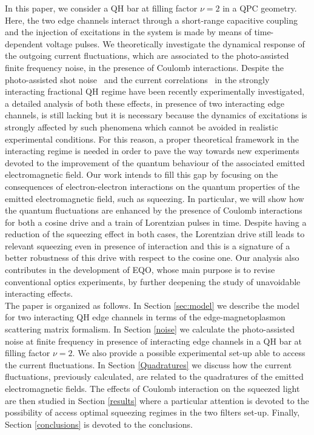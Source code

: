 \documentclass[12pt]{iopart}
\begin{document}
In this paper, we consider a QH bar at filling factor $\nu=2$ in a QPC geometry. Here, the two edge channels interact through a short-range capacitive coupling and the injection of excitations in the system is made by means of time-dependent voltage pulses. We theoretically investigate the dynamical response of the outgoing current fluctuations, which are associated to the photo-assisted finite frequency noise, in the presence of Coulomb interactions. Despite the photo-assisted shot noise~\cite{Kapfer19} and the current correlations~\cite{Bartolomei20} in the strongly interacting fractional QH regime have been recently experimentally investigated, a detailed analysis of both these effects, in presence of two interacting edge channels, is still lacking but it is necessary because the dynamics of excitations is strongly affected by such phenomena which cannot be avoided in realistic experimental conditions. For this reason, a proper theoretical framework in the interacting regime is needed in order to pave the way towards new experiments devoted to the improvement of the quantum behaviour of the associated emitted electromagnetic field. Our work intends to fill this gap by focusing on the consequences of electron-electron interactions on the quantum properties of the emitted electromagnetic field, such as squeezing. In particular, we will show how the quantum fluctuations are enhanced by the presence of Coulomb interactions for both a cosine drive and a train of Lorentzian pulses in time. Despite having a reduction of the squeezing effect in both cases, the Lorentzian drive still leads to relevant squeezing even in presence of interaction and this is a signature of a better robustness of this drive with respect to the cosine one. Our analysis also contributes in the development of EQO, whose main purpose is to revise conventional optics experiments, by further deepening the study of unavoidable interacting effects.\\
The paper is organized as follows. In Section \ref{sec:model} we describe the model for two interacting QH edge channels in terms of the edge-magnetoplasmon scattering matrix formalism. In Section \ref{noise} we calculate the photo-assisted noise at finite frequency in presence of interacting edge channels in a QH bar at filling factor $\nu=2$. We also provide a possible experimental set-up able to access the current fluctuations. In Section \ref{Quadratures} we discuss how the current fluctuations, previously calculated, are related to the quadratures of the emitted electromagnetic fields. The effects of Coulomb interaction on the squeezed light are then studied in Section \ref{results} where a particular attention is devoted to the possibility of access optimal squeezing regimes in the two filters set-up. Finally, Section \ref{conclusions} is devoted to the conclusions. 
 
\end{document}
